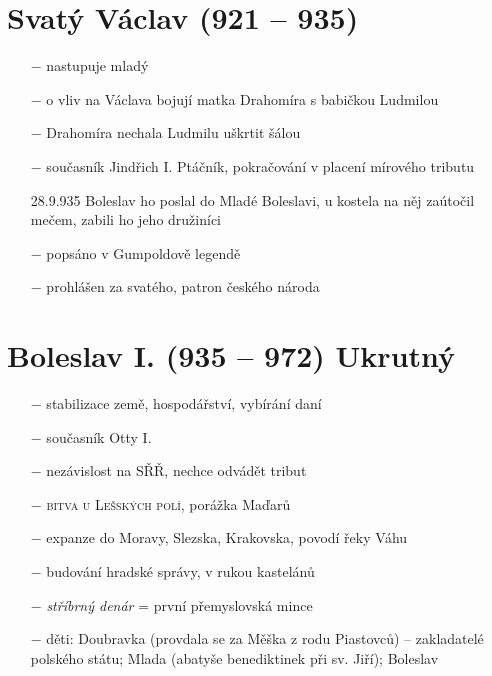 \documentclass{article}
\begin{document}
\section*{Svatý Václav (921 -- 935)}
\begin{itemize}
    \vspace{-0.5em}
    \setlength\itemsep{0.15em}
    \item[$-$] nastupuje mladý
    \item[$-$] o vliv na Václava bojují matka Drahomíra s babičkou Ludmilou
    \item[$-$] Drahomíra nechala Ludmilu uškrtit šálou
    \item[$-$] současník Jindřich I. Ptáčník, pokračování v placení mírového tributu
    \item[28.9.935] Boleslav ho poslal do Mladé Boleslavi, u kostela na něj zaútočil mečem, zabili ho jeho družiníci
    \item[$-$] popsáno v Gumpoldově legendě
    \item[$-$] prohlášen za svatého, patron českého národa
\end{itemize}

\section*{Boleslav I. (935 -- 972) Ukrutný}
\begin{itemize}
    \vspace{-0.5em}
    \setlength\itemsep{0.15em}
    \item[$-$] stabilizace země, hospodářství, vybírání daní
    \item[$-$] současník Otty I.
    \item[$-$] nezávislost na SŘŘ, nechce odvádět tribut
    \item[$-$] \textsc{bitva u Lešských polí}, porážka Maďarů
    \item[$-$] expanze do Moravy, Slezska, Krakovska, povodí řeky Váhu
    \item[$-$] budování hradské správy, v rukou kastelánů
    \item[$-$] \textit{stříbrný denár} = první přemyslovská mince
    \item[$-$] děti: Doubravka (provdala se za Měška z rodu Piastovců) -- zakladatelé polského státu; Mlada (abatyše benediktinek při sv. Jiří); Boleslav
\end{itemize}
\end{document}
